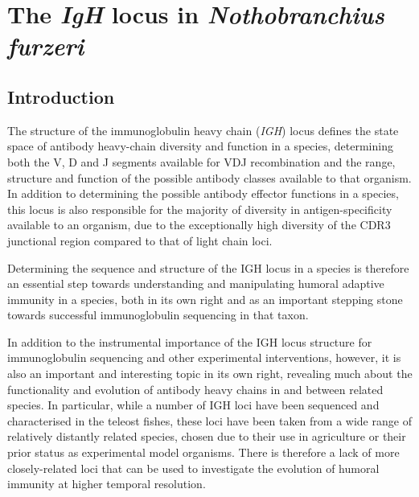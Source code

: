 
\chapter{The \textit{IgH} locus in \textit{Nothobranchius furzeri}}  
\onehalfspacing




\pagebreak


\section{Introduction}

The structure of the immunoglobulin heavy chain (\textit{IGH}) locus defines the state space of antibody heavy-chain diversity and function in a species, determining both the V, D and J segments available for VDJ recombination and the range, structure and function of the possible antibody classes available to that organism. In addition to determining the possible antibody effector functions in a species, this locus is also responsible for the majority of diversity in antigen-specificity available to an organism, due to the exceptionally high diversity of the CDR3 junctional region compared to that of light chain loci. 

Determining the sequence and structure of the IGH locus in a species is therefore an essential step towards understanding and manipulating humoral adaptive immunity in a species, both in its own right and as an important stepping stone towards successful immunoglobulin sequencing in that taxon.

In addition to the instrumental importance of the IGH locus structure for immunoglobulin sequencing and other experimental interventions, however, it is also an important and interesting topic in its own right, revealing much about the functionality and evolution of antibody heavy chains in and between related species. In particular, while a number of IGH loci have been sequenced and characterised in the teleost fishes, these loci have been taken from a wide range of relatively distantly related species, chosen due to their use in agriculture or their prior status as experimental model organisms. There is therefore a lack of more closely-related loci that can be used to investigate the evolution of humoral immunity at higher temporal resolution. 

